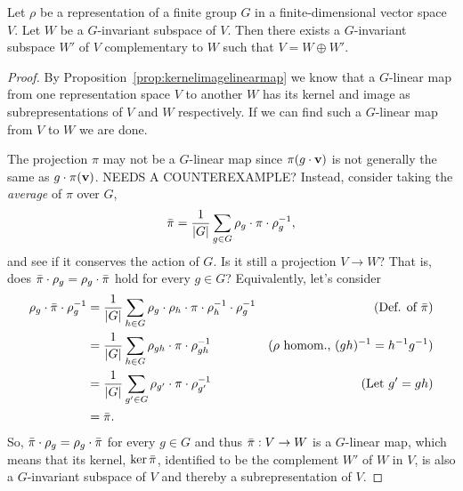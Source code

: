 \begin{proposition}\label{prop:complsubrepr}
	Let $\rho$ be a representation of a finite group $G$ in a finite-dimensional vector space $V$. Let $W$ be a $G$-invariant subspace of $V$. Then there exists a $G$-invariant subspace $W'$ of $V$ complementary to $W$ such that $V = W \oplus W'$.
\end{proposition}
\begin{proof}
	By Proposition~\ref{prop:kernelimagelinearmap} we know that a $G$-linear map from one representation space $V$ to another $W$ has its kernel and image as subrepresentations of $V$ and $W$ respectively. If we can find such a $G$-linear map from $V$ to $W$ we are done.
	
	The projection $\pi$ may not be a $G$-linear map since $\pi(g \cdot \mathbf{v})$ is not generally the same as $g \cdot \pi(\mathbf{v})$. NEEDS A COUNTEREXAMPLE?
	Instead, consider taking the \textit{average} of $\pi$ over $G$,
	\begin{align*}
		\bar{\pi} = \frac{1}{|G|} \sum_{g \in G} \rho_g \cdot \pi \cdot \rho_g^{-1},
	\end{align*}
	and see if it conserves the action of $G$. Is it still a projection $V \rightarrow W$?  That is, does $\bar{\pi}\cdot \rho_g = \rho_g \cdot \bar{\pi}$ hold for every $g \in G$? Equivalently, let's consider
	\begin{align*}
		\rho_g \cdot \bar{\pi} \cdot \rho_g^{-1} &= \frac{1}{|G|} \sum_{h \in G} \rho_g \cdot \rho_h \cdot \pi \cdot \rho_h^{-1} \cdot \rho_g^{-1} & \text{(Def. of $\bar{\pi}$)}\\
		&= \frac{1}{|G|} \sum_{h \in G} \rho_{gh} \cdot \pi \cdot \rho_{gh}^{-1} & \text{($\rho$ homom., $(gh)^{-1}=h^{-1}g^{-1}$)}\\
		&= \frac{1}{|G|} \sum_{g' \in G} \rho_{g'} \cdot \pi \cdot \rho_{g'}^{-1} & \text{(Let $g' = gh$)} \\
		&= \bar{\pi}.
	\end{align*}
	So, $\bar{\pi} \cdot \rho_g = \rho_g \cdot \bar{\pi}$ for every $g \in G$ and thus $\bar{\pi}: V \rightarrow W$ is a $G$-linear map, which means that its kernel, $\ker \bar{\pi}$, identified to be the complement $W'$ of $W$ in $V$, is also a $G$-invariant subspace of $V$ and thereby a subrepresentation of $V$.
\end{proof}


